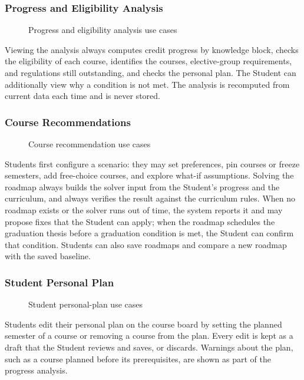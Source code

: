 \subsubsection{Progress and Eligibility Analysis}
\begin{figure}[H]
    \centering
    
    \caption{Progress and eligibility analysis use cases}
\end{figure}
Viewing the analysis always computes credit progress by knowledge block, checks the eligibility of each course, identifies the courses, elective-group requirements, and regulations still outstanding, and checks the personal plan. The Student can additionally view why a condition is not met. The analysis is recomputed from current data each time and is never stored.

\subsubsection{Course Recommendations}
\begin{figure}[H]
    \centering
    
    \caption{Course recommendation use cases}
\end{figure}
Students first configure a scenario: they may set preferences, pin courses or freeze semesters, add free-choice courses, and explore what-if assumptions. Solving the roadmap always builds the solver input from the Student's progress and the curriculum, and always verifies the result against the curriculum rules. When no roadmap exists or the solver runs out of time, the system reports it and may propose fixes that the Student can apply; when the roadmap schedules the graduation thesis before a graduation condition is met, the Student can confirm that condition. Students can also save roadmaps and compare a new roadmap with the saved baseline.

\subsubsection{Student Personal Plan}
\begin{figure}[H]
    \centering
    
    \caption{Student personal-plan use cases}
\end{figure}
Students edit their personal plan on the course board by setting the planned semester of a course or removing a course from the plan. Every edit is kept as a draft that the Student reviews and saves, or discards. Warnings about the plan, such as a course planned before its prerequisites, are shown as part of the progress analysis.

